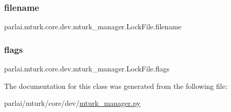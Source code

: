 \subsubsection{\texorpdfstring{filename}{filename}}
{\footnotesize\ttfamily parlai.\+mturk.\+core.\+dev.\+mturk\+\_\+manager.\+Lock\+File.\+filename}

\mbox{\label{classparlai_1_1mturk_1_1core_1_1dev_1_1mturk__manager_1_1LockFile_a29d99800098413cab4074297d38018a3}} 
\subsubsection{\texorpdfstring{flags}{flags}}
{\footnotesize\ttfamily parlai.\+mturk.\+core.\+dev.\+mturk\+\_\+manager.\+Lock\+File.\+flags\hspace{0.3cm}{\ttfamily [static]}}



The documentation for this class was generated from the following file\+:\begin{DoxyCompactItemize}
\item 
parlai/mturk/core/dev/\hyperlink{dev_2mturk__manager_8py}{mturk\+\_\+manager.\+py}\end{DoxyCompactItemize}
